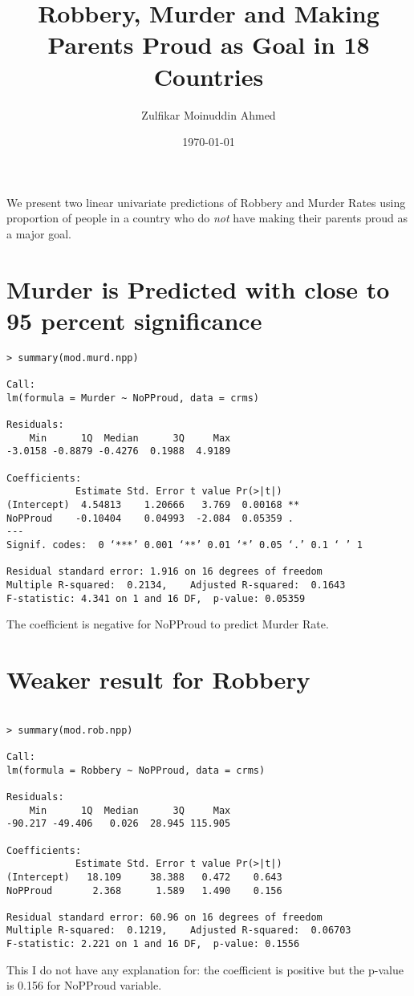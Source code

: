 \documentclass{amsart}
\title{Robbery, Murder and Making Parents Proud as Goal in 18 Countries}
\author{Zulfikar Moinuddin Ahmed}
\date{\today}
\begin{document}
\maketitle
We present two linear univariate predictions of Robbery and Murder Rates using proportion of people in a country who do {\em not} have making their parents proud as a major goal.

\section{Murder is Predicted with close to 95 percent significance}

\begin{verbatim}
> summary(mod.murd.npp)

Call:
lm(formula = Murder ~ NoPProud, data = crms)

Residuals:
    Min      1Q  Median      3Q     Max 
-3.0158 -0.8879 -0.4276  0.1988  4.9189 

Coefficients:
            Estimate Std. Error t value Pr(>|t|)   
(Intercept)  4.54813    1.20666   3.769  0.00168 **
NoPProud    -0.10404    0.04993  -2.084  0.05359 . 
---
Signif. codes:  0 ‘***’ 0.001 ‘**’ 0.01 ‘*’ 0.05 ‘.’ 0.1 ‘ ’ 1

Residual standard error: 1.916 on 16 degrees of freedom
Multiple R-squared:  0.2134,	Adjusted R-squared:  0.1643 
F-statistic: 4.341 on 1 and 16 DF,  p-value: 0.05359
\end{verbatim}

The coefficient is negative for NoPProud to predict Murder Rate.

\section{Weaker result for Robbery}

\begin{verbatim}

> summary(mod.rob.npp)

Call:
lm(formula = Robbery ~ NoPProud, data = crms)

Residuals:
    Min      1Q  Median      3Q     Max 
-90.217 -49.406   0.026  28.945 115.905 

Coefficients:
            Estimate Std. Error t value Pr(>|t|)
(Intercept)   18.109     38.388   0.472    0.643
NoPProud       2.368      1.589   1.490    0.156

Residual standard error: 60.96 on 16 degrees of freedom
Multiple R-squared:  0.1219,	Adjusted R-squared:  0.06703 
F-statistic: 2.221 on 1 and 16 DF,  p-value: 0.1556
\end{verbatim}

This I do not have any explanation for: the coefficient is positive but the p-value is 0.156 for NoPProud variable.
\end{document}
